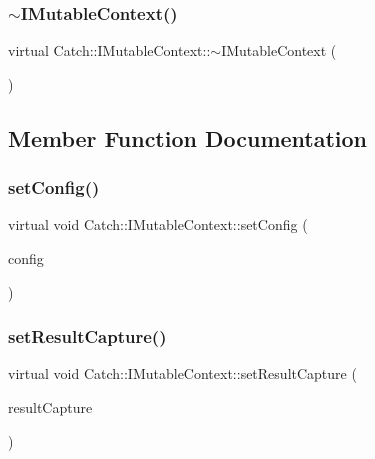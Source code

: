 \subsubsection{\texorpdfstring{$\sim$\+I\+Mutable\+Context()}{~IMutableContext()}}
{\footnotesize\ttfamily virtual Catch\+::\+I\+Mutable\+Context\+::$\sim$\+I\+Mutable\+Context (\begin{DoxyParamCaption}{ }\end{DoxyParamCaption})\hspace{0.3cm}{\ttfamily [virtual]}}



\subsection{Member Function Documentation}
\mbox{\label{struct_catch_1_1_i_mutable_context_a013e8f688a8ea7970262d07ead542a63}} 
\subsubsection{\texorpdfstring{set\+Config()}{setConfig()}}
{\footnotesize\ttfamily virtual void Catch\+::\+I\+Mutable\+Context\+::set\+Config (\begin{DoxyParamCaption}\item[{\mbox{\hyperlink{class_catch_1_1_ptr}{Ptr}}$<$ I\+Config const $>$ const \&}]{config }\end{DoxyParamCaption})\hspace{0.3cm}{\ttfamily [pure virtual]}}

\mbox{\label{struct_catch_1_1_i_mutable_context_a4a80afd0525b7def21bee8d9b48f2d39}} 
\subsubsection{\texorpdfstring{set\+Result\+Capture()}{setResultCapture()}}
{\footnotesize\ttfamily virtual void Catch\+::\+I\+Mutable\+Context\+::set\+Result\+Capture (\begin{DoxyParamCaption}\item[{\mbox{\hyperlink{struct_catch_1_1_i_result_capture}{I\+Result\+Capture}} $\ast$}]{result\+Capture }\end{DoxyParamCaption})\hspace{0.3cm}{\ttfamily [pure virtual]}}

